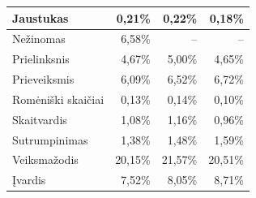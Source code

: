 \documentclass{VUMIFInfBakalaurinis}
\begin{document}
\begin{table}[H]
\begin{tabular}{|l|r|r|r|}
Jaustukas                 & 0,21\%                          & 0,22\%                                                                                         & 0,18\%                                                                                     \\ \hline
Nežinomas                 & 6,58\%                          & --                                                                                             & --                                                                                         \\ \hline
Prielinksnis              & 4,67\%                          & 5,00\%                                                                                         & 4,65\%                                                                                     \\ \hline
Prieveiksmis              & 6,09\%                          & 6,52\%                                                                                         & 6,72\%                                                                                     \\ \hline
Romėniški skaičiai        & 0,13\%                          & 0,14\%                                                                                         & 0,10\%                                                                                     \\ \hline
Skaitvardis               & 1,08\%                          & 1,16\%                                                                                         & 0,96\%                                                                                     \\ \hline
Sutrumpinimas             & 1,38\%                          & 1,48\%                                                                                         & 1,59\%                                                                                     \\ \hline
Veiksmažodis              & 20,15\%                         & 21,57\%                                                                                        & 20,51\%                                                                                    \\ \hline
Įvardis                   & 7,52\%                          & 8,05\%                                                                                         & 8,71\%                                                                                     \\ \hline
\end{tabular}
\end{table}
\end{document}
